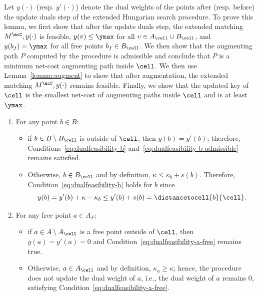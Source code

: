 \hungarianProp*
%
%
%



Let $y(\cdot)$ (resp. $y'(\cdot)$) denote the dual weights of the points after (resp. before) the update duals step of the extended Hungarian search procedure. To prove this lemma, we first show that after the update duals step, the extended matching $M^\mcC, y(\cdot)$ is feasible, $y(v)\le \ymax$ for all $v\in A_\cell\cup B_\cell$, and $y(b_f)=\ymax$ for all free points $b_f\in B_\cell$. We then show that the augmenting path $P$ computed by the procedure is admissible and conclude that $P$ is a minimum net-cost augmenting path inside $\cell$. We then use Lemma~\ref{lemma:augment} to show that after augmentation, the extended matching $M^\mcC, y(\cdot)$ remains feasible. Finally, we show that the updated key of $\cell$ is the smallest net-cost of augmenting paths inside $\cell$ and is at least $\ymax$.

    \begin{enumerate}
        \item For any point $b\in B$:
        \begin{itemize}
            \item if $b\in B\setminus B_\cell$ is outside of $\cell$, then $y(b)=y'(b)$; therefore, Conditions~\eqref{eq:dualfeasibility-b} and~\eqref{eq:dualfeasibility-b-admissible} remains satisfied.
            \item Otherwise, $b\in B_\cell$ and by definition, $\kappa\le \kappa_b+s(b)$. Therefore, Condition~\eqref{eq:dualfeasibility-b} holds for $b$ since 
            \begin{equation}\label{eq:global-hung-2}
                y(b) = y'(b) + \kappa - \kappa_b \le y'(b) + s(b) =\distancetocell{b}{\cell}. 
            \end{equation}
        \end{itemize}
        \item For any free point $a\in A_F$:
        \begin{itemize}
            \item if $a\in A\setminus A_\cell$ is a free point outside of $\cell$, then $y(a)=y'(a)=0$ and Condition~\eqref{eq:dualfeasibility-a-free} remains true. 
            \item Otherwise, $a\in A_\cell$ and by definition, $\kappa_a\ge \kappa$; hence, the procedure does not update the dual weight of $a$, i.e., the dual weight of $a$ remains $0$, satisfying Condition~\eqref{eq:dualfeasibility-a-free}. 
        \end{itemize}
        
    \end{enumerate}

